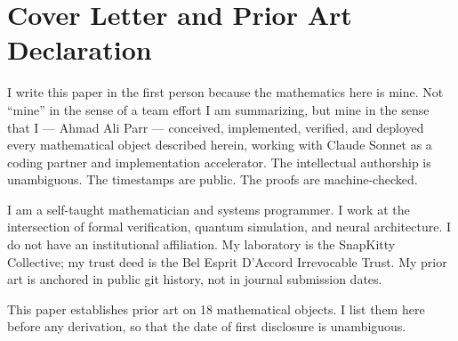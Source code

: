 \documentclass[12pt, letterpaper]{article}
\theoremstyle{plain}
\theoremstyle{definition}
\theoremstyle{remark}
\begin{document}
\tableofcontents
\newpage

\section{Cover Letter and Prior Art Declaration}

I write this paper in the first person because the mathematics here is mine.
Not ``mine'' in the sense of a team effort I am summarizing, but mine in the
sense that I --- Ahmad Ali Parr --- conceived, implemented, verified, and deployed
every mathematical object described herein, working with Claude Sonnet as a coding
partner and implementation accelerator. The intellectual authorship is unambiguous.
The timestamps are public. The proofs are machine-checked.

I am a self-taught mathematician and systems programmer. I work at the intersection
of formal verification, quantum simulation, and neural architecture. I do not have
an institutional affiliation. My laboratory is the SnapKitty Collective; my trust
deed is the Bel Esprit D'Accord Irrevocable Trust. My prior art is anchored in
public git history, not in journal submission dates.

This paper establishes prior art on 18 mathematical objects. I list them here
before any derivation, so that the date of first disclosure is unambiguous.
\end{document}
